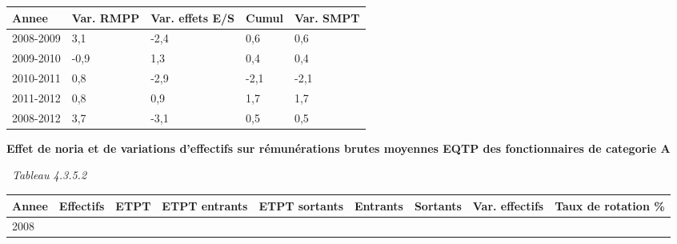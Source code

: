\begin{longtable}[]{@{}lllll@{}}
\toprule
Annee & Var. RMPP & Var. effets E/S & Cumul & Var. SMPT\tabularnewline
\midrule
\endhead
2008-2009 & 3,1 & -2,4 & 0,6 & 0,6\tabularnewline
2009-2010 & -0,9 & 1,3 & 0,4 & 0,4\tabularnewline
2010-2011 & 0,8 & -2,9 & -2,1 & -2,1\tabularnewline
2011-2012 & 0,8 & 0,9 & 1,7 & 1,7\tabularnewline
2008-2012 & 3,7 & -3,1 & 0,5 & 0,5\tabularnewline
\bottomrule
\end{longtable}

\textbf{Effet de noria et de variations d'effectifs sur rémunérations
brutes moyennes EQTP des fonctionnaires de categorie A}

~\emph{Tableau 4.3.5.2}

\begin{longtable}[]{@{}lllllllll@{}}
\toprule
\begin{minipage}[b]{0.05\columnwidth}\raggedright
Annee\strut
\end{minipage} & \begin{minipage}[b]{0.08\columnwidth}\raggedright
Effectifs\strut
\end{minipage} & \begin{minipage}[b]{0.05\columnwidth}\raggedright
ETPT\strut
\end{minipage} & \begin{minipage}[b]{0.10\columnwidth}\raggedright
ETPT entrants\strut
\end{minipage} & \begin{minipage}[b]{0.10\columnwidth}\raggedright
ETPT sortants\strut
\end{minipage} & \begin{minipage}[b]{0.07\columnwidth}\raggedright
Entrants\strut
\end{minipage} & \begin{minipage}[b]{0.07\columnwidth}\raggedright
Sortants\strut
\end{minipage} & \begin{minipage}[b]{0.11\columnwidth}\raggedright
Var. effectifs\strut
\end{minipage} & \begin{minipage}[b]{0.14\columnwidth}\raggedright
Taux de rotation \%\strut
\end{minipage}\tabularnewline
\midrule
\endhead
\begin{minipage}[t]{0.05\columnwidth}\raggedright
2008\strut
\end{minipage} & \begin{minipage}[t]{0.08\columnwidth}\raggedright

\end{minipage}
\end{longtable}

